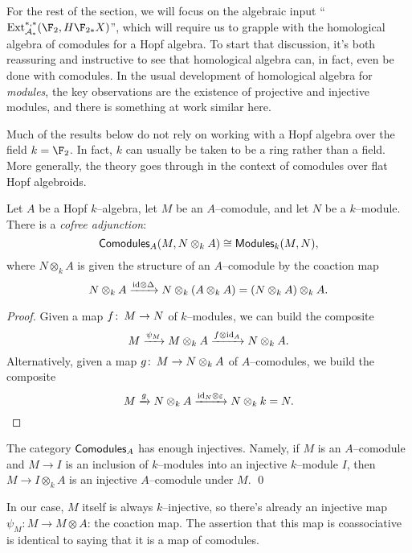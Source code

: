 For the rest of the section, we will focus on the algebraic input ``$\Ext_{\mathcal A_*}^{*, *}(\F_2, H\F_{2*} X)$'', which will require us to grapple with the homological algebra of comodules for a Hopf algebra.  To start that discussion, it's both reassuring and instructive to see that homological algebra can, in fact, even be done with comodules.  In the usual development of homological algebra for \emph{modules}, the key observations are the existence of projective and injective modules, and there is something at work similar here.

\begin{remark}
Much of the results below do not rely on working with a Hopf algebra over the field $k = \F_2$.  In fact, $k$ can usually be taken to be a ring rather than a field. More generally, the theory goes through in the context of comodules over flat Hopf algebroids.
\end{remark}

\begin{lemma}
Let $A$ be a Hopf $k$--algebra, let $M$ be an $A$--comodule, and let $N$ be a $k$--module.  There is a \textit{cofree adjunction}: \[\mathsf{Comodules}_A(M, N \otimes_k A) \cong \mathsf{Modules}_k(M, N),\] where $N \otimes_k A$ is given the structure of an $A$--comodule by the coaction map \[N \otimes_k A \xrightarrow{\mathrm{id} \otimes \Delta} N \otimes_k (A \otimes_k A) = (N \otimes_k A) \otimes_k A.\]
\end{lemma}
\begin{proof}
Given a map $f\colon\thinspace M \to N$ of $k$--modules, we can build the composite \[M \xrightarrow{\psi_M} M \otimes_k A \xrightarrow{f \otimes \mathrm{id}_A} N \otimes_k A.\]  Alternatively, given a map $g\colon\thinspace M \to N \otimes_k A$ of $A$--comodules, we build the composite \[M \xrightarrow{g} N \otimes_k A \xrightarrow{\mathrm{id}_N \otimes \varepsilon} N \otimes_k k = N. \qedhere\]
\end{proof}

\begin{corollary}
The category $\mathsf{Comodules}_A$ has enough injectives.  Namely, if $M$ is an $A$--comodule and $M \to I$ is an inclusion of $k$--modules into an injective $k$--module $I$, then $M \to I \otimes_k A$ is an injective $A$--comodule under $M$. \qed
\end{corollary}
\begin{remark}
In our case, $M$ itself is always $k$--injective, so there's already an injective map $\psi_M: M \to M \otimes A$: the coaction map.  The assertion that this map is coassociative is identical to saying that it is a map of comodules.
\end{remark}

